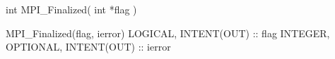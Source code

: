int MPI_Finalized( int *flag )

MPI_Finalized(flag, ierror)
LOGICAL, INTENT(OUT) :: flag
INTEGER, OPTIONAL, INTENT(OUT) :: ierror
